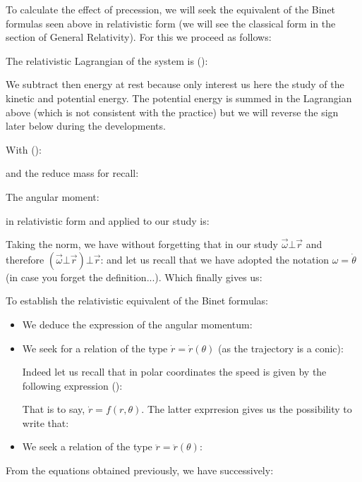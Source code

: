 	To calculate the effect of precession, we will seek the equivalent of the Binet formulas seen above in relativistic form (we will see the classical form in the section of General Relativity). For this we proceed as follows:

	The relativistic Lagrangian of the system is ():
	
	\begin{tcolorbox}[title=Remark,colframe=black,arc=10pt]
	We subtract then energy at rest because only interest us here the study of the kinetic and potential energy. The potential energy is summed in the Lagrangian above (which is not consistent with the practice) but we will reverse the sign later below during the developments.
	\end{tcolorbox}
	With ():
	
	and the reduce mass for recall:
	
	The angular moment:
	
	in relativistic form and applied to our study is:
	
	Taking the norm, we have without forgetting that in our study $\vec{\omega}\bot\vec{r}$ and therefore $(\vec{\omega}\bot\vec{r})\bot\vec{r}$:
	and let us recall that we have adopted the notation $\omega=\dot{\theta}$ (in case you forget the definition...). Which finally gives us:
	
	To establish the relativistic equivalent of the Binet formulas:
	\begin{itemize}
		\item We deduce the expression of the angular momentum:
		

		\item We seek for a relation of the type $\dot{r}=\dot{r}(\theta)$ (as the trajectory is a conic):
		
		Indeed let us recall that in polar coordinates the speed is given by the following expression ():
		
		That is to say, $\dot{r}=f(r,\theta)$. The latter exprresion gives us the possibility to write that:
		
		
		\item We seek a relation of the type $\ddot{r}=\ddot{r}(\theta)$:
		
	\end{itemize}
	From the equations obtained previously, we have successively:
	
